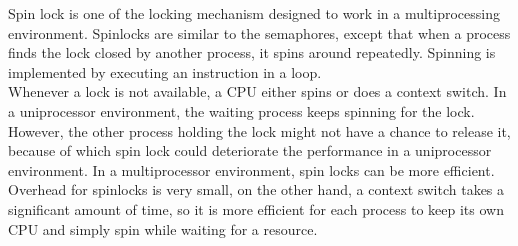 Spin lock is one of the locking mechanism designed to work in a multiprocessing environment. Spinlocks are similar to the semaphores, except that when a process finds the lock closed by another process, it spins around repeatedly. Spinning is implemented by executing an instruction in a loop. \cite{Bovet:2005:ULK:1077084}
\\
Whenever a lock is not available, a CPU either spins or does a context switch. In a uniprocessor environment, the waiting process keeps spinning for the lock. However, the other process holding the lock might not have a chance to release it, because of which spin lock could deteriorate the performance in a uniprocessor environment. In a multiprocessor environment, spin locks can be more efficient. Overhead for spinlocks is very small, on the other hand, a context switch takes a significant amount of time, so it is more efficient for each process to keep its own CPU and simply spin while waiting for a resource. \cite{Bovet:2005:ULK:1077084}

